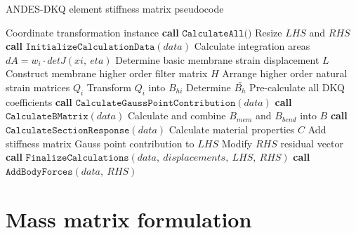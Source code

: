 \begin{algorithm}
	\onehalfspacing
	\caption{ANDES-DKQ element stiffness matrix pseudocode}\label{ANDES-DKQ element stiffness matrix}
	\begin{algorithmic}[1]
		\Require Coordinate transformation instance
		\State \textbf{call} $\texttt{CalculateAll()}$
		\State Resize $LHS$ and $RHS$
		\State \textbf{call} $\texttt{InitializeCalculationData}(data)$
		\State \hspace{\algorithmicindent}Calculate integration areas $dA = w_i \cdot detJ(xi,\ eta)$
		\State \hspace{\algorithmicindent}Determine basic membrane strain displacement $L$
		\State \hspace{\algorithmicindent}Construct membrane higher order filter matrix $H$
		\State \hspace{\algorithmicindent}Arrange higher order natural strain matrices $Q_i$
		\State \hspace{\algorithmicindent}Transform $Q_i$ into $B_{hi}$
		\State \hspace{\algorithmicindent}Determine $\bar{B_h}$
		\State \hspace{\algorithmicindent}Pre-calculate all DKQ coefficients
		\State \textbf{call} $\texttt{CalculateGaussPointContribution}(data)$
		\State \hspace{\algorithmicindent}\textbf{call} $\texttt{CalculateBMatrix}(data)$
		\State \hspace{\algorithmicindent}\hspace{\algorithmicindent} Calculate and combine $B_{mem}$ and $B_{bend}$ into $B$
		\State \hspace{\algorithmicindent}\textbf{call} $\texttt{CalculateSectionResponse}(data)$
		\State \hspace{\algorithmicindent}\hspace{\algorithmicindent} Calculate material properties $C$
		\State \hspace{\algorithmicindent}Add stiffness matrix Gauss point contribution to $LHS$
		\EndWhile
		\State Modify $RHS$ residual vector
		\State \textbf{call} $\texttt{FinalizeCalculations}(data,\ displacements,\ LHS,\ RHS)$
		\State \textbf{call} $\texttt{AddBodyForces}(data,\ RHS)$
	\end{algorithmic}
\end{algorithm}

\section{Mass matrix formulation}

